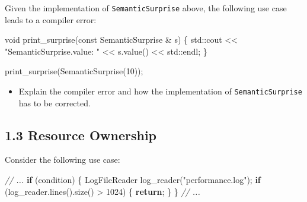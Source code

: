 \documentclass[]{article}
\newenvironment{Shaded}{}{}
\newcommand{\KeywordTok}[1]{\textcolor[rgb]{0.00,0.44,0.13}{\textbf{{#1}}}}
\newcommand{\DataTypeTok}[1]{\textcolor[rgb]{0.56,0.13,0.00}{{#1}}}
\newcommand{\DecValTok}[1]{\textcolor[rgb]{0.25,0.63,0.44}{{#1}}}
\newcommand{\StringTok}[1]{\textcolor[rgb]{0.25,0.44,0.63}{{#1}}}
\newcommand{\CommentTok}[1]{\textcolor[rgb]{0.38,0.63,0.69}{\textit{{#1}}}}
\newcommand{\NormalTok}[1]{{#1}}
\providecommand{\tightlist}{%
  \setlength{\itemsep}{0pt}\setlength{\parskip}{0pt}}
\begin{document}
Given the implementation of \texttt{SemanticSurprise} above, the
following use case leads to a compiler error:

\begin{Shaded}
\begin{Highlighting}[]
\DataTypeTok{void} \NormalTok{print_surprise(}\DataTypeTok{const} \NormalTok{SemanticSurprise & s) \{}
  \NormalTok{std::cout << }\StringTok{"SemanticSurprise.value: "} \NormalTok{<< s.value() << std::endl;}
\NormalTok{\}}

\NormalTok{print_surprise(SemanticSurprise(}\DecValTok{10}\NormalTok{));}
\end{Highlighting}
\end{Shaded}

\begin{itemize}
\tightlist
\item
  Explain the compiler error and how the implementation of
  \texttt{SemanticSurprise} has to be corrected.
\end{itemize}

\subsection{1.3 Resource Ownership}\label{resource-ownership}

Consider the following use case:

\begin{Shaded}
\begin{Highlighting}[]
\CommentTok{// ...}
\KeywordTok{if} \NormalTok{(condition) \{}
        \NormalTok{LogFileReader log_reader(}\StringTok{"performance.log"}\NormalTok{);}
        \KeywordTok{if} \NormalTok{(log_reader.lines().size() > }\DecValTok{1024}\NormalTok{) \{ }\KeywordTok{return}\NormalTok{; \}}
\NormalTok{\}}
\CommentTok{// ...}
\end{Highlighting}
\end{Shaded}
\end{document}
